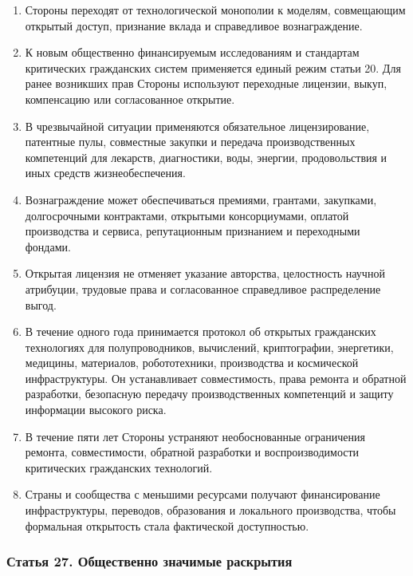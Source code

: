 \documentclass[
  russian,
  11pt,
  a4paper,
]{article}
\providecommand{\tightlist}{%
  \setlength{\itemsep}{0pt}\setlength{\parskip}{0pt}}
\begin{document}
\begin{enumerate}
\def\labelenumi{\arabic{enumi}.}
\tightlist
\item
  Стороны переходят от технологической монополии к моделям, совмещающим
  открытый доступ, признание вклада и справедливое вознаграждение.
\item
  К новым общественно финансируемым исследованиям и стандартам
  критических гражданских систем применяется единый режим статьи 20. Для
  ранее возникших прав Стороны используют переходные лицензии, выкуп,
  компенсацию или согласованное открытие.
\item
  В чрезвычайной ситуации применяются обязательное лицензирование,
  патентные пулы, совместные закупки и передача производственных
  компетенций для лекарств, диагностики, воды, энергии, продовольствия и
  иных средств жизнеобеспечения.
\item
  Вознаграждение может обеспечиваться премиями, грантами, закупками,
  долгосрочными контрактами, открытыми консорциумами, оплатой
  производства и сервиса, репутационным признанием и переходными
  фондами.
\item
  Открытая лицензия не отменяет указание авторства, целостность научной
  атрибуции, трудовые права и согласованное справедливое распределение
  выгод.
\item
  В течение одного года принимается протокол об открытых гражданских
  технологиях для полупроводников, вычислений, криптографии, энергетики,
  медицины, материалов, робототехники, производства и космической
  инфраструктуры. Он устанавливает совместимость, права ремонта и
  обратной разработки, безопасную передачу производственных компетенций
  и защиту информации высокого риска.
\item
  В течение пяти лет Стороны устраняют необоснованные ограничения
  ремонта, совместимости, обратной разработки и воспроизводимости
  критических гражданских технологий.
\item
  Страны и сообщества с меньшими ресурсами получают финансирование
  инфраструктуры, переводов, образования и локального производства,
  чтобы формальная открытость стала фактической доступностью.
\end{enumerate}

\subsubsection{Статья 27. Общественно значимые
раскрытия}\label{ux441ux442ux430ux442ux44cux44f-27-ux43eux431ux449ux435ux441ux442ux432ux435ux43dux43dux43e-ux437ux43dux430ux447ux438ux43cux44bux435-ux440ux430ux441ux43aux440ux44bux442ux438ux44f}
\end{document}
